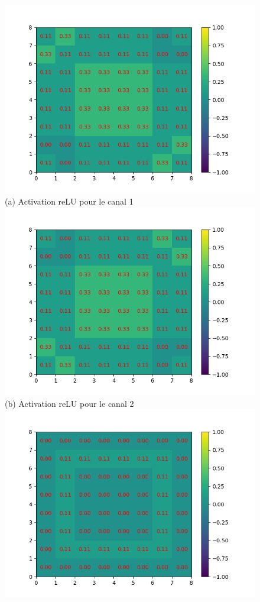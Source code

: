 \begin{figure}[!h]
        \includegraphics[width=\textwidth]{img/cnn_exemple/square/activation_relu_1.png}
        \center 
        (a) Activation reLU pour le canal 1
    \endminipage\hfill
        \includegraphics[width=\textwidth]{img/cnn_exemple/square/activation_relu_2.png}
        \center 
        (b) Activation reLU pour le canal 2
    \endminipage\hfill
        \includegraphics[width=\textwidth]{img/cnn_exemple/square/activation_relu_3.png}

\end{figure}
